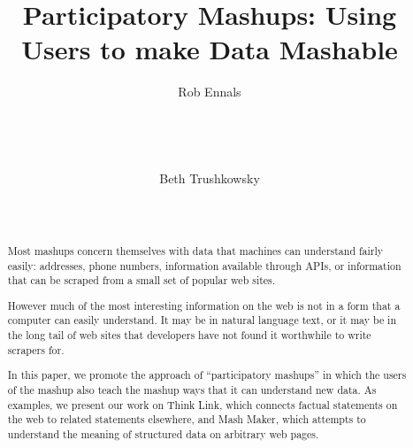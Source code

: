 \documentclass{chi2009}
\begin{document}
\setlength{\paperheight}{11in}
\setlength{\paperwidth}{8.5in}
\setlength{\pdfpageheight}{\paperheight}
\setlength{\pdfpagewidth}{\paperwidth}
%

\title{Participatory Mashups: Using Users to make Data Mashable}



\author{
\alignauthor Rob Ennals\\
       \\
       \\
       \\
       \\
\alignauthor Beth Trushkowsky\\
       \\
       \\
}
\sloppy 

\maketitle

\begin{abstract}
Most mashups concern themselves with data that machines can understand fairly easily: addresses, phone numbers, information available through APIs, or information that can be scraped from a small set of popular web sites.

However much of the most interesting information on the web is not in a form that a computer can easily understand. It may be in natural language text, or it may be in the long tail of web sites that developers have not found it worthwhile to write scrapers for.

In this paper, we promote the approach of ``participatory mashups'' in which the users of the mashup also teach the mashup ways that it can understand new data. As examples, we present our work on Think Link, which connects factual statements on the web to related statements elsewhere, and Mash Maker, which attempts to understand the meaning of structured data on arbitrary web pages.
\end{abstract}
\end{document}
